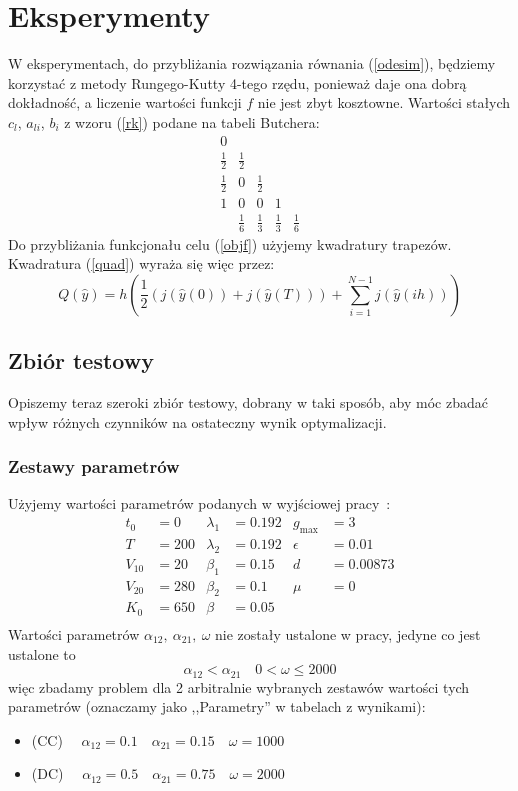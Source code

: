 \documentclass[11pt]{article}
\begin{document}
\section{Eksperymenty}
W eksperymentach, do przybliżania rozwiązania równania (\ref{odesim}), będziemy korzystać z metody Rungego-Kutty 4-tego rzędu, ponieważ daje ona dobrą dokładność, a liczenie wartości funkcji $f$ nie jest zbyt kosztowne. Wartości stałych $c_l$, $a_{li}$, $b_i$ z wzoru (\ref{rk}) podane na tabeli Butchera:
\begin{equation}\label{butcher}
  \begin{array}
    {c|cccc}
    0\\
    \frac{1}{2} & \frac{1}{2}\\
    \frac{1}{2} &0 &\frac{1}{2} \\
    1& 0& 0& 1\\
    \hline{}
    & \frac{1}{6} &\frac{1}{3} &\frac{1}{3} &\frac{1}{6} 
  \end{array}
\end{equation}
Do przybliżania funkcjonału celu (\ref{objf}) użyjemy kwadratury trapezów. Kwadratura (\ref{quad}) wyraża się więc przez:
\begin{equation} \label{trapezoidal}
  Q(\hat{y}) = h\left(\frac{1}{2}(j(\hat{y}(0)) + j(\hat{y}(T))) + \sum_{i=1}^{N-1} j(\hat{y}(ih))\right)
\end{equation}

\subsection{Zbiór testowy}
Opiszemy teraz szeroki zbiór testowy, dobrany w taki sposób, aby móc zbadać wpływ różnych czynników na ostateczny wynik optymalizacji.
\subsubsection{Zestawy parametrów}
Użyjemy wartości parametrów podanych w wyjściowej pracy~\cite{BBF-manuscript}:
\begin{align*}
  t_0 &= 0          & \lambda_1 &= 0.192 & g_{\max} &= 3    \\
  T &= 200          & \lambda_2 &= 0.192 & \epsilon &= 0.01 \\
  V_{10} &= 20      & \beta_1 &= 0.15    & d &= 0.00873     \\
  V_{20} &= 280     & \beta_2 &= 0.1     & \mu &= 0         \\
  K_0 &= 650        & \beta &= 0.05      &       &          \\
\end{align*}
Wartości parametrów $\alpha_{12},\ \alpha_{21},\ \omega$ nie zostały ustalone w pracy, jedyne co jest ustalone to
\[ \alpha_{12} < \alpha_{21}\quad 0 < \omega \le 2000 \]
więc zbadamy problem dla 2 arbitralnie wybranych zestawów wartości tych parametrów (oznaczamy jako ,,Parametry'' w tabelach z wynikami):
\begin{itemize}
\item{(CC)} $\quad \alpha_{12} = 0.1 \quad \alpha_{21} = 0.15 \quad \omega = 1000$
\item{(DC)} $\quad \alpha_{12} = 0.5 \quad \alpha_{21} = 0.75 \quad \omega = 2000$ 
\end{itemize}
\end{document}
